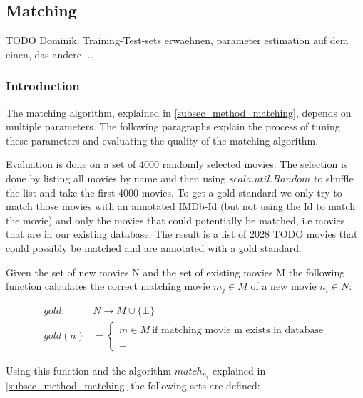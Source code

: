 \subsection{Matching}
\label{subsec_evaluation_matching}

TODO Dominik: Training-Test-sets erwaehnen, parameter estimation auf dem einen, das andere ...

\subsubsection{Introduction}
The matching algorithm, explained in \ref{subsec_method_matching}, depends on multiple parameters. The following paragraphs explain the process of tuning these parameters and evaluating the quality of the matching algorithm.

Evaluation is done on a set of 4000 randomly selected movies. The selection is done by listing all movies by name and then using $scala.util.Random$ to shuffle the list and take the first 4000 movies.
To get a gold standard we only try to match those movies with an annotated IMDb-Id (but not using the Id to match the movie) and only the movies that could potentially be matched, i.e movies that are in our existing database.
The result is a list of 2028 TODO movies that could possibly be matched and are annotated with a gold standard.

Given the set of new movies N and the set of existing movies M the following function calculates the correct matching movie $m_{j} \in M$ of a new movie $n_{i} \in N$:

\begin{align}
	gold: ~&N \rightarrow M \cup \{\bot\} \\
	gold(n) &=
		\begin{cases}
		m \in M ~\text{if matching movie m exists in database}  \\
		\bot
		\end{cases}
\end{align}

Using this function and the algorithm $match_{n_{i}}$ explained in \ref{subsec_method_matching} the following sets are defined:

